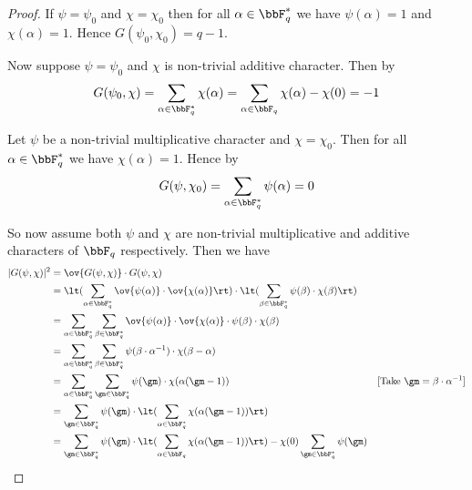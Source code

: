 \begin{proof}
  If $\psi=\psi_0$ and $\chi=\chi_0$ then for all $\alpha\in\bbF_q^*$ we have $\psi(\alpha)=1$ and $\chi(\alpha)=1$. Hence $G(\psi_0,\chi_0)=q-1$.

  Now suppose $\psi=\psi_0$ and $\chi$ is non-trivial additive character. Then by  $$G(\psi_0,\chi)=\sum_{\alpha\in\bbF_q^*}\chi(\alpha)=\sum_{\alpha\in\bbF_q}\chi(\alpha)-\chi(0)=-1$$

  Let $\psi$ be a non-trivial multiplicative character and $\chi=\chi_0$. Then for all $\alpha\in\bbF_q^*$ we have $\chi(\alpha)=1$. Hence by $$G(\psi,\chi_0)=\sum_{\alpha\in\bbF_q^*}\psi(\alpha)=0$$

  So now assume both $\psi$ and $\chi$ are non-trivial multiplicative and additive characters of $\bbF_q$ respectively. Then we have \begin{align*}
    |G(\psi,\chi)|^2 & = \ov{G(\psi,\chi)}\cdot G(\psi,\chi)                                                                                                                                                    \\
                     & = \lt(\sum_{\alpha\in\bbF_q^*}\ov{\psi(\alpha)}\cdot \ov{\chi(\alpha)}\rt) \cdot \lt(\sum_{\beta\in\bbF_q^*}\psi(\beta)\cdot \chi(\beta) \rt)                                            \\
                     & = \sum_{\alpha\in\bbF_q^*}\sum_{\beta\in\bbF_q^*}\ov{\psi(\alpha)}\cdot \ov{\chi(\alpha)}\cdot \psi(\beta)\cdot \chi(\beta)                                                              \\
                     & = \sum_{\alpha\in\bbF_q^*}\sum_{\beta\in\bbF_q^*}\psi(\beta\cdot \alpha^{-1})\cdot \chi(\beta-\alpha)                                                                                    \\
                     & = \sum_{\alpha\in\bbF_q^*}\sum_{\gm\in\bbF_q^*}\psi(\gm)\cdot \chi(\alpha(\gm-1))                                                             & [\text{Take }\gm=\beta\cdot \alpha^{-1}] \\
                     & = \sum_{\gm\in\bbF_q^*}\psi(\gm)\cdot \lt(\sum_{\alpha\in\bbF_q^*}\chi(\alpha(\gm-1))\rt)                                                                                                \\
                     & = \sum_{\gm\in\bbF_q^*}\psi(\gm)\cdot \lt(\sum_{\alpha\in\bbF_q}\chi(\alpha(\gm-1))\rt) -\chi(0)\sum_{\gm\in\bbF_q^*}\psi(\gm)                                                           \\

\end{align*}
\end{proof}
